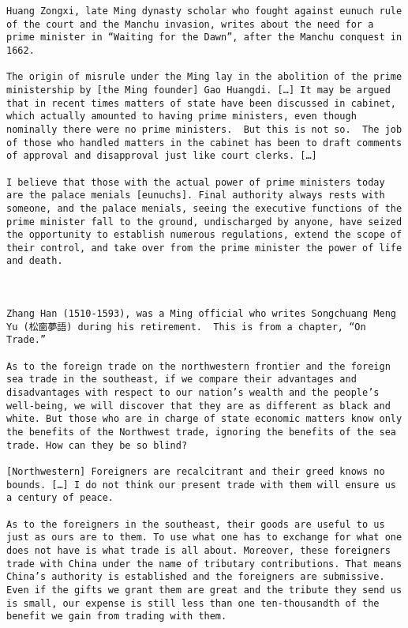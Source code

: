 \documentclass[letterpaper]{article}
\begin{document}
\begin{verbatim}
Huang Zongxi, late Ming dynasty scholar who fought against eunuch rule of the court and the Manchu invasion, writes about the need for a prime minister in “Waiting for the Dawn”, after the Manchu conquest in 1662.

The origin of misrule under the Ming lay in the abolition of the prime ministership by [the Ming founder] Gao Huangdi. […] It may be argued that in recent times matters of state have been discussed in cabinet, which actually amounted to having prime ministers, even though nominally there were no prime ministers.  But this is not so.  The job of those who handled matters in the cabinet has been to draft comments of approval and disapproval just like court clerks. […] 

I believe that those with the actual power of prime ministers today are the palace menials [eunuchs]. Final authority always rests with someone, and the palace menials, seeing the executive functions of the prime minister fall to the ground, undischarged by anyone, have seized the opportunity to establish numerous regulations, extend the scope of their control, and take over from the prime minister the power of life and death.



Zhang Han (1510-1593), was a Ming official who writes Songchuang Meng Yu (松窗夢語) during his retirement.  This is from a chapter, “On Trade.”

As to the foreign trade on the northwestern frontier and the foreign sea trade in the southeast, if we compare their advantages and disadvantages with respect to our nation’s wealth and the people’s well-being, we will discover that they are as different as black and white. But those who are in charge of state economic matters know only the benefits of the Northwest trade, ignoring the benefits of the sea trade. How can they be so blind?

[Northwestern] Foreigners are recalcitrant and their greed knows no bounds. […] I do not think our present trade with them will ensure us a century of peace.

As to the foreigners in the southeast, their goods are useful to us just as ours are to them. To use what one has to exchange for what one does not have is what trade is all about. Moreover, these foreigners trade with China under the name of tributary contributions. That means China’s authority is established and the foreigners are submissive. Even if the gifts we grant them are great and the tribute they send us is small, our expense is still less than one ten-thousandth of the benefit we gain from trading with them.




\end{verbatim}
\end{document}
